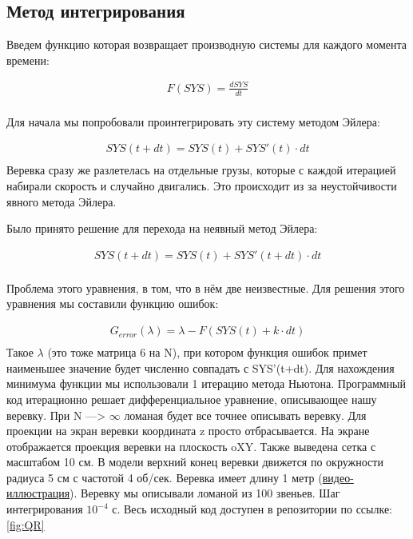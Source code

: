 \documentclass[a4paper,12pt]{article}
\begin{document}
\subsection{Метод интегрирования}
Введем функцию которая возвращает производную системы для каждого момента времени:

\begin{equation}
    \begin{aligned}
	F(SYS) = \frac{dSYS}{dt}\\
    \end{aligned}
\end{equation}

Для начала мы попробовали проинтегрировать эту систему методом Эйлера:

\begin{equation}
    \begin{aligned}
	SYS(t+dt) = SYS(t) + SYS'(t)\cdot dt\\
    \end{aligned}
\end{equation}
 Веревка сразу же разлетелась на отдельные грузы, которые с каждой итерацией набирали скорость и случайно двигались. Это происходит из за неустойчивости явного метода Эйлера.
 
 Было принято решение для перехода на неявный метод Эйлера:

\begin{equation}
    \begin{aligned}
	SYS(t+dt) = SYS(t) + SYS'(t+dt)\cdot dt\\
    \end{aligned}
\end{equation}

Проблема этого уравнения, в том, что в нём две неизвестные. 
Для решения этого уравнения мы составили функцию ошибок:

\begin{equation}
    \begin{aligned}
	G_{error}(\lambda) = \lambda-F(SYS(t) + k\cdot dt)\\
    \end{aligned}
\end{equation}
Такое $\lambda$ (это тоже матрица 6 на N), при котором функция ошибок примет наименьшее значение будет численно совпадать с SYS'(t+dt). 
Для нахождения минимума функции мы использовали 1 итерацию метода Ньютона. 
Программный код итерационно решает дифференциальное уравнение, описывающее нашу веревку. При N ---> $\infty$ ломаная будет все точнее описывать веревку.
Для проекции на экран веревки координата z просто отбрасывается. На экране отображается проекция веревки на плоскость oXY. Также выведена сетка с масштабом 10 см.
В модели верхний конец веревки движется по окружности радиуса 5 см с частотой 4 об/сек.  Веревка имеет длину 1 метр (\href{run:media/video.mov}{видео-иллюстрация}).
Веревку мы описывали ломаной из 100 звеньев. Шаг интегрирования $10^{-4}$ с.
Весь исходный код доступен в репозитории по ссылке: \ref{fig:QR}
\end{document}

